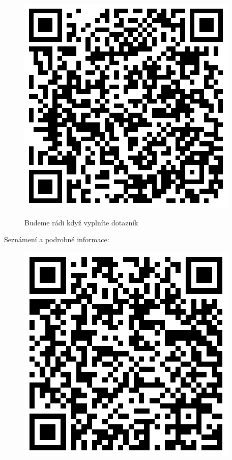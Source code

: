 \documentclass[12pt]{article}
\begin{document}
\begin{figure}[H]
      \includegraphics[scale=0.3]{../../../../propagace/qrcodes/dotaznik.png}
      \begin{center}
        Budeme rádi když vyplníte dotazník
      \end{center}
    \endminipage
  \end{figure}

Seznámení a podrobné informace:
\begin{figure}[H]
\includegraphics[scale=0.3]{../../../../propagace/qrcodes/introduction.png}
\end{figure}
\end{document}
